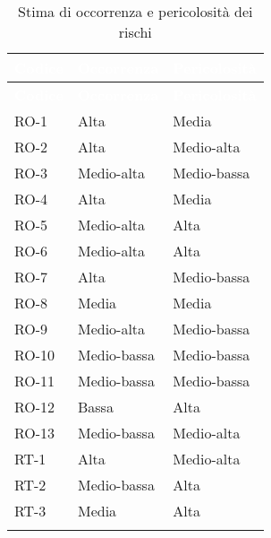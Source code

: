 {
\setlength{\tabcolsep}{10pt}
\renewcommand{\arraystretch}{1.5}
\begin{xltabular}{\textwidth}{| l | l | l |}
        \hline
         \textbf{\textcolor{white}{Codice}} & \textbf{\textcolor{white}{Occorrenza}} & \textbf{\textcolor{white}{Pericolosità}} \\
        \hline
        \endfirsthead
        \hline
         \textbf{\textcolor{white}{Codice}} & \textbf{\textcolor{white}{Occorrenza}} & \textbf{\textcolor{white}{Pericolosità}} \\
        \hline
        \endhead
        RO-1 & Alta & Media \\
        \hline
        RO-2 & Alta & Medio-alta \\
        \hline
        RO-3 & Medio-alta & Medio-bassa \\
        \hline
        RO-4 & Alta & Media \\
        \hline
        RO-5 & Medio-alta & Alta \\
        \hline
        RO-6 & Medio-alta & Alta \\
        \hline
        RO-7 & Alta & Medio-bassa \\
        \hline
        RO-8 & Media & Media \\
        \hline
        RO-9 & Medio-alta & Medio-bassa \\
        \hline
        RO-10 & Medio-bassa & Medio-bassa \\
        \hline
        RO-11 & Medio-bassa & Medio-bassa \\
        \hline
        RO-12 & Bassa & Alta \\
        \hline
        RO-13 & Medio-bassa & Medio-alta \\
        \hline
        RT-1 & Alta & Medio-alta \\
        \hline
        RT-2 & Medio-bassa & Alta \\
        \hline
        RT-3 & Media & Alta \\
        \hline
     \caption{Stima di occorrenza e pericolosità dei rischi}
    \label{tab:stimarischi}
\end{xltabular}
}


